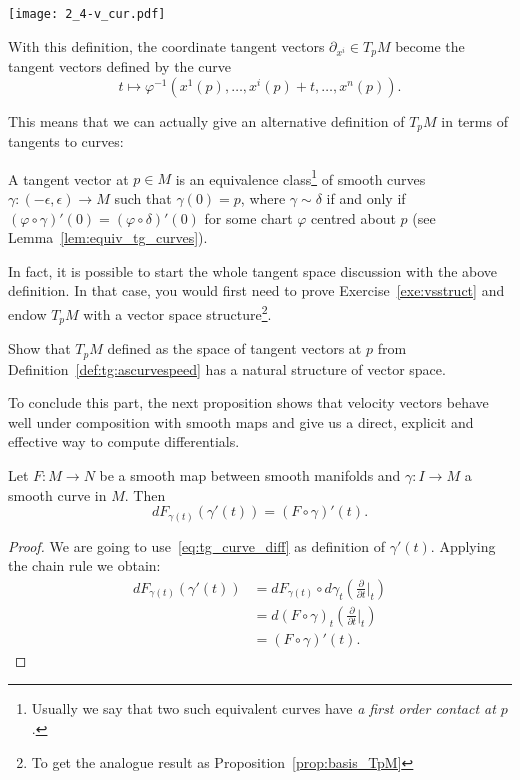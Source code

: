 \begin{marginfigure}
	\texttt{[image: 2\_4-v\_cur.pdf]}
	\caption{With this definition, the coordinate tangent vectors $\partial_{x^i}\in T_p M$ become the tangent vectors defined by the curve \[t \mapsto \varphi^{-1}(x^1(p), \ldots, {x^i(p) + t}, \ldots, x^n(p)).\]}
	\label{fig:2_4-v_cur}
\end{marginfigure}
This means that we can actually give an alternative definition of $T_pM$ in terms of tangents to curves:
\begin{definition}\label{def:tg:ascurvespeed}
	A tangent vector at $p\in M$ is an equivalence class\footnote{Usually we say that two such equivalent curves have \emph{a first order contact at $p$}.} of smooth curves $\gamma:(-\epsilon, \epsilon)\to M$ such that $\gamma(0)=p$, where $\gamma\sim\delta$ if and only if $(\varphi\circ \gamma)'(0) = (\varphi\circ\delta)'(0)$ for some chart $\varphi$ centred about $p$ (see Lemma~\ref{lem:equiv_tg_curves}).
\end{definition}

In fact, it is possible to start the whole tangent space discussion with the above definition. In that case, you would first need to prove Exercise~\ref{exe:vsstruct} and endow $T_pM$ with a vector space structure\footnote{To get the analogue result as Proposition~\ref{prop:basis_TpM}}.

\begin{exercise}
	Show that $T_p M$ defined as the space of tangent vectors at $p$ from Definition~\ref{def:tg:ascurvespeed} has a natural structure of vector space.
\end{exercise}

To conclude this part, the next proposition shows that velocity vectors behave well under composition with smooth maps and give us a direct, explicit and effective way to compute differentials.

\begin{proposition}\label{prop:curves_deriv}
	Let $F:M\to N$ be a smooth map between smooth manifolds and $\gamma:I\to M$ a smooth curve in $M$.
	Then
	\begin{equation}
		d F_{\gamma(t)} (\gamma'(t)) = (F\circ\gamma)'(t).
	\end{equation}
\end{proposition}
\begin{proof}
	We are going to use~\eqref{eq:tg_curve_diff} as definition of $\gamma'(t)$.
	Applying the chain rule we obtain:
	\begin{align}
		d F_{\gamma(t)} (\gamma'(t))
		 & = d F_{\gamma(t)} \circ d\gamma_t\left(\frac{\partial}{\partial t}\Big|_t\right) \\
		 & = d (F\circ\gamma)_t \left(\frac{\partial}{\partial t}\Big|_t\right)             \\
		 & = (F\circ\gamma)'(t).
	\end{align}
\end{proof}

